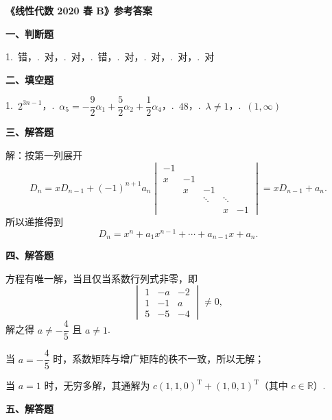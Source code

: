 \documentclass[a4paper,11pt]{ctexart}
\newcommand{\T}{\mathrm{T}}
\begin{document}
\begin{center}
  {\Large\bfseries 《线性代数 2020 春 B》参考答案}
\end{center}

\vspace{0.6em}

\textbf{一、判断题}

1.\ 错，.\ 对，.\ 对，.\ 错，.\ 对，.\ 对，.\ 对，.\ 对

\vspace{0.8em}

\textbf{二、填空题}

1.\ $2^{3n-1}$，.\ $\alpha_5 = -\dfrac{9}{2}\alpha_1 + \dfrac{5}{2}\alpha_2 + \dfrac{1}{2}\alpha_4$，.\ $48$，.\ $\lambda \neq 1$，.\ $(1, \infty)$

\vspace{0.5em}

\textbf{三、解答题}

解：按第一列展开
\[
  D_n = x D_{n-1} + (-1)^{n+1} a_n
  \begin{vmatrix}
    -1 & & & & \\
    x & -1 & & & \\
    & x & -1 & & \\
    & & \ddots & \ddots & \\
    & & & x & -1
  \end{vmatrix}
  = x D_{n-1} + a_n.
\]
所以递推得到
\[
  D_n = x^n + a_1 x^{n-1} + \cdots + a_{n-1} x + a_n.
\]

\vspace{0.5em}

\textbf{四、解答题}

方程有唯一解，当且仅当系数行列式非零，即
\[
  \begin{vmatrix}
    1 & -a & -2 \\
    1 & -1 & a \\
    5 & -5 & -4
  \end{vmatrix} \neq 0,
\]
解之得 $a \neq -\dfrac{4}{5}$ 且 $a \neq 1$.

当 $a = -\dfrac{4}{5}$ 时，系数矩阵与增广矩阵的秩不一致，所以无解；

当 $a = 1$ 时，无穷多解，其通解为 $c(1, 1, 0)^{\T} + (1, 0, 1)^{\T}$（其中 $c \in \mathbb{R}$）.

\vspace{0.5em}

\textbf{五、解答题} \par\nopagebreak
\end{document}
